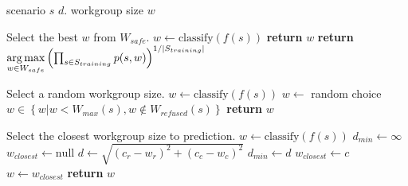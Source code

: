 \begin{algorithmic}[1]
  \Require scenario $s$
  $d$.
  \Ensure workgroup size $w$

  \Comment Select the best $w$ from $W_{safe}$.
  \State $w \leftarrow \text{classify}(f(s))$
  \State \textbf{return} $w$
  \Else
  \State \textbf{return} $\underset{w \in W_{safe}}{\operatorname*{arg\,max}}
  \left(
  \prod_{s \in S_{training}} p(s, w)
  \right)^{1/|S_{training}|}$
  \EndIf
  \EndProcedure
  \item[] %

  \Comment Select a random workgroup size.
  \State $w \leftarrow \text{classify}(f(s))$
  \State $w \leftarrow $ random choice $w \in \left\{ w | w < W_{max}(s), w \not\in W_{refused}(s) \right\}$
  \EndWhile
  \State \textbf{return} $w$
  \EndProcedure
  \item[] %

  \Comment Select the closest workgroup size to prediction.
  \State $w \leftarrow \text{classify}(f(s))$
  \State $d_{min} \leftarrow \infty$
  \State $w_{closest} \leftarrow \text{null}$
  \State $d \leftarrow \sqrt{\left(c_r - w_r\right)^2 + \left(c_c - w_c\right)^2}$
  \State $d_{min} \leftarrow d$
  \State $w_{closest} \leftarrow c$
  \EndIf
  \EndFor
  \State $w \leftarrow w_{closest}$
  \EndWhile
  \State \textbf{return} $w$
  \EndProcedure
\end{algorithmic}
